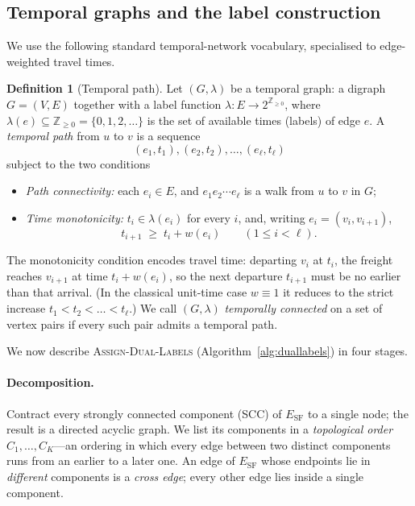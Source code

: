 \documentclass[11pt]{article}
\theoremstyle{definition}
\newtheorem{definition}{Definition}
\theoremstyle{remark}
\newcommand{\ESF}{E_{\mathrm{SF}}}
\begin{document}
\subsection{Temporal graphs and the label construction}

We use the following standard temporal-network vocabulary, specialised to edge-weighted travel times.

\begin{definition}[Temporal path]\label{def:temporal}
Let $(G,\lambda)$ be a temporal graph: a digraph $G=(V,E)$ together with a label function
$\lambda:E\to 2^{\mathbb{Z}_{\ge 0}}$, where $\lambda(e)\subseteq\mathbb{Z}_{\ge 0}=\{0,1,2,\dots\}$ is
the set of available times (labels) of edge $e$. A \emph{temporal path} from $u$ to $v$ is a sequence
\[
  (e_1,t_1),(e_2,t_2),\dots,(e_\ell,t_\ell)
\]
subject to the two conditions
\begin{itemize}[topsep=2pt,itemsep=2pt]
  \item \emph{Path connectivity:} each $e_i\in E$, and $e_1e_2\cdots e_\ell$ is a walk from $u$ to $v$
        in $G$;
  \item \emph{Time monotonicity:} $t_i\in\lambda(e_i)$ for every $i$, and, writing $e_i=(v_i,v_{i+1})$,
        \[
          t_{i+1}\;\ge\;t_i+w(e_i)\qquad(1\le i<\ell).
        \]
\end{itemize}
The monotonicity condition encodes travel time: departing $v_i$ at $t_i$, the freight reaches
$v_{i+1}$ at time $t_i+w(e_i)$, so the next departure $t_{i+1}$ must be no earlier than that arrival.
(In the classical unit-time case $w\equiv 1$ it reduces to the strict increase
$t_1<t_2<\dots<t_\ell$.) We call $(G,\lambda)$ \emph{temporally connected} on a set of vertex pairs if
every such pair admits a temporal path.
\end{definition}

We now describe \textsc{Assign-Dual-Labels} (Algorithm~\ref{alg:duallabels}) in four stages.

\paragraph{Decomposition.} Contract every strongly connected component (SCC) of $\ESF$ to a single
node; the result is a directed acyclic graph. We list its components in a \emph{topological order}
$C_1,\dots,C_K$---an ordering in which every edge between two distinct components runs from an earlier
to a later one. An edge of $\ESF$ whose endpoints lie in \emph{different} components is a \emph{cross
edge}; every other edge lies inside a single component.
\end{document}

